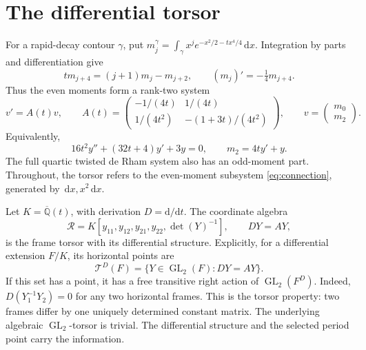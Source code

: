 \documentclass[11pt]{article}
\theoremstyle{definition}
\newcommand{\Q}{\mathbb Q}
\newcommand{\GL}{\operatorname{GL}}
\newcommand{\dd}{\,\mathrm d}
\numberwithin{equation}{section}
\begin{document}
\section{The differential torsor}\label{sec:torsor}
For a rapid-decay contour $\gamma$, put
$m_j^\gamma=\int_\gamma x^j e^{-x^2/2-tx^4/4}\dd x$.
Integration by parts and differentiation give
\begin{equation}\label{eq:ibp}
 t m_{j+4}=(j+1)m_j-m_{j+2},\qquad
 (m_j)'=-\tfrac14m_{j+4}.
\end{equation}
Thus the even moments form a rank-two system
\begin{equation}\label{eq:connection}
 v'=A(t)v,\qquad
 A(t)=\begin{pmatrix}-1/(4t)&1/(4t)\\
 1/(4t^2)&-(1+3t)/(4t^2)\end{pmatrix},\qquad
 v=\begin{pmatrix}m_0\\m_2\end{pmatrix}.
\end{equation}
Equivalently,
\begin{equation}\label{eq:scalarODE}
 16t^2 y''+(32t+4)y'+3y=0,\qquad m_2=4t y'+y.
\end{equation}
The full quartic twisted de Rham system also has an odd-moment part.
Throughout, the torsor refers to the even-moment subsystem
\eqref{eq:connection}, generated by $\dd x,x^2\dd x$.

Let $K=\overline{\Q}(t)$, with derivation $D=\mathrm d/\mathrm dt$.
The coordinate algebra
\begin{equation}\label{eq:torsoralgebra}
 \mathcal R=K[y_{11},y_{12},y_{21},y_{22},\det(Y)^{-1}],
 \qquad DY=AY,
\end{equation}
is the frame torsor with its differential structure. Explicitly, for a
differential extension $F/K$, its horizontal points are
\[
 \mathcal T^D(F)=\{Y\in\GL_2(F):DY=AY\}.
\]
If this set has a point, it has a free transitive right action of
$\GL_2(F^D)$. Indeed,
$D(Y_1^{-1}Y_2)=0$ for any two horizontal frames. This is the torsor
property: two frames differ by one uniquely determined constant matrix.
The underlying algebraic $\GL_2$-torsor is trivial. The differential
structure and the selected period point carry the information.
\end{document}
